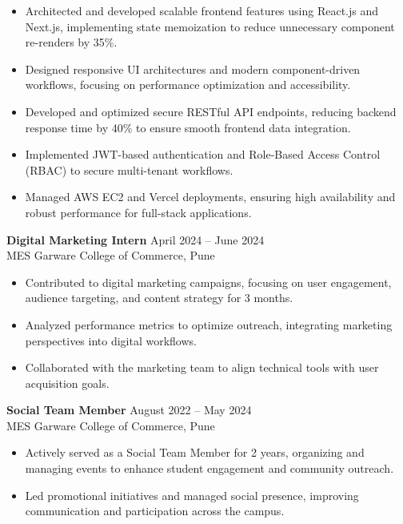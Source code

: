 \documentclass[a4paper,10pt]{article}
\begin{document}
\begin{itemize}[leftmargin=*]
    \item Architected and developed scalable frontend features using React.js and Next.js, implementing state memoization to reduce unnecessary component re-renders by 35\%.
    \item Designed responsive UI architectures and modern component-driven workflows, focusing on performance optimization and accessibility.
    \item Developed and optimized secure RESTful API endpoints, reducing backend response time by 40\% to ensure smooth frontend data integration.
    \item Implemented JWT-based authentication and Role-Based Access Control (RBAC) to secure multi-tenant workflows.
    \item Managed AWS EC2 and Vercel deployments, ensuring high availability and robust performance for full-stack applications.
\end{itemize}

\textbf{Digital Marketing Intern} \hfill April 2024 -- June 2024\\
MES Garware College of Commerce, Pune

\begin{itemize}[leftmargin=*]
    \item Contributed to digital marketing campaigns, focusing on user engagement, audience targeting, and content strategy for 3 months.
    \item Analyzed performance metrics to optimize outreach, integrating marketing perspectives into digital workflows.
    \item Collaborated with the marketing team to align technical tools with user acquisition goals.
\end{itemize}

\textbf{Social Team Member} \hfill August 2022 -- May 2024\\
MES Garware College of Commerce, Pune

\begin{itemize}[leftmargin=*]
    \item Actively served as a Social Team Member for 2 years, organizing and managing events to enhance student engagement and community outreach.
    \item Led promotional initiatives and managed social presence, improving communication and participation across the campus.
\end{itemize}
\end{document}
